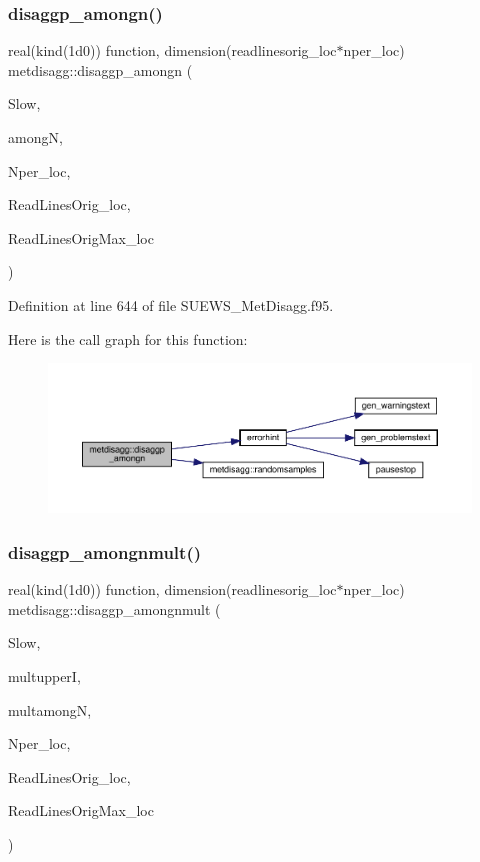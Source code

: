\subsubsection{\texorpdfstring{disaggp\+\_\+amongn()}{disaggp\_amongn()}}
{\footnotesize\ttfamily real(kind(1d0)) function, dimension(readlinesorig\+\_\+loc$\ast$nper\+\_\+loc) metdisagg\+::disaggp\+\_\+amongn (\begin{DoxyParamCaption}\item[{real(kind(1d0)), dimension(readlinesorig\+\_\+loc)}]{Slow,  }\item[{integer}]{amongN,  }\item[{integer}]{Nper\+\_\+loc,  }\item[{integer}]{Read\+Lines\+Orig\+\_\+loc,  }\item[{integer}]{Read\+Lines\+Orig\+Max\+\_\+loc }\end{DoxyParamCaption})}



Definition at line 644 of file S\+U\+E\+W\+S\+\_\+\+Met\+Disagg.\+f95.

Here is the call graph for this function\+:\nopagebreak
\begin{figure}[H]
\begin{center}
\leavevmode
\includegraphics[width=350pt]{namespacemetdisagg_a68fe3bfaf0b4ea325a7560e9c5ed518a_cgraph}
\end{center}
\end{figure}
\mbox{\label{namespacemetdisagg_aba0eed0257bc8f0ce67fac76eae7375b}} 
\subsubsection{\texorpdfstring{disaggp\+\_\+amongnmult()}{disaggp\_amongnmult()}}
{\footnotesize\ttfamily real(kind(1d0)) function, dimension(readlinesorig\+\_\+loc$\ast$nper\+\_\+loc) metdisagg\+::disaggp\+\_\+amongnmult (\begin{DoxyParamCaption}\item[{real(kind(1d0)), dimension(readlinesorig\+\_\+loc)}]{Slow,  }\item[{real(kind(1d0)), dimension(5)}]{multupperI,  }\item[{integer, dimension(5)}]{multamongN,  }\item[{integer}]{Nper\+\_\+loc,  }\item[{integer}]{Read\+Lines\+Orig\+\_\+loc,  }\item[{integer}]{Read\+Lines\+Orig\+Max\+\_\+loc }\end{DoxyParamCaption})}



